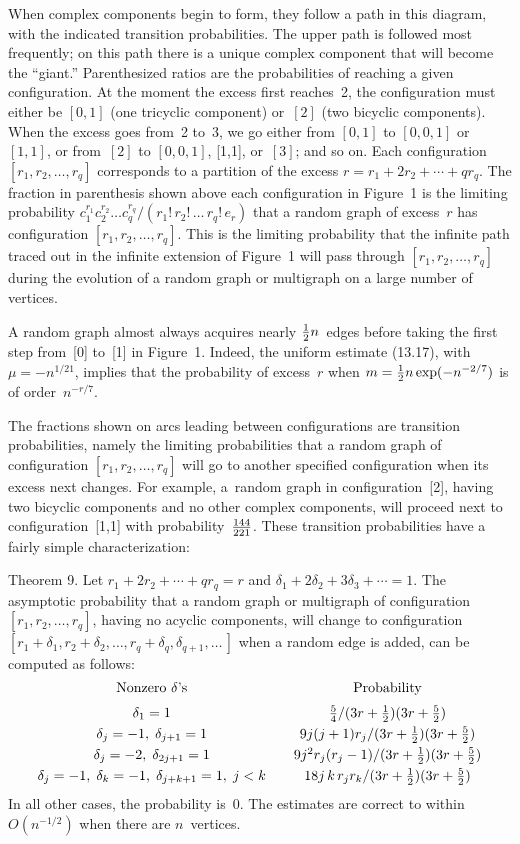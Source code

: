 \bigskip
\noindent
When complex components begin to form, they follow a path in
this diagram, with the indicated transition probabilities. The upper
path is followed most frequently; on this path
there is a unique complex component that will become
the ``giant.'' Parenthesized ratios
are the probabilities of reaching a given configuration.
At the moment the excess first reaches~2, the configuration must
either be $[0,1]$ (one tricyclic component) or~$[2]$ (two bicyclic
components). When the excess goes from~2 to~3, we go either from
$[0,1]$ to $[0,0,1]$ or $[1,1]$, or from~$[2]$ to $[0,0,1]$, [1,1],
or~$[3]$; and so on. Each configuration $[r_1,r_2,\ldots,r_q]$
corresponds to a partition of the excess $r=r_1+2r_2+\cdots +qr_q$.
The fraction in parenthesis shown above each configuration in Figure~1
is the limiting probability $c_1^{r_1}c_2^{r_2}\ldots
c_q^{r_q}\!/(r_1!\,r_2!\,\ldots\, r_q!\,e_r)$ that a random graph of
excess~$r$ has configuration $[r_1,r_2,\ldots,r_q]$. This is the
limiting probability that the infinite path traced out in the
infinite extension of Figure~1 will pass through
$[r_1,r_2,\ldots,r_q]$ during the evolution of a random graph or
multigraph on a large number of vertices.

A random graph almost always acquires nearly ${1\over2} n$~edges
before taking the first step from~[0] to~[1] in Figure~1. Indeed, the
uniform estimate (13.17), with $\mu=-n^{1/21}$, implies that the
probability of excess~$r$ when $m={1\over2} n\exp(-n^{-2/7})$ is of
order~$n^{-r/7}$.

The fractions shown on arcs leading between configurations are
transition probabilities, namely the limiting probabilities that a
random graph of configuration $[r_1,r_2,\ldots,r_q]$ will go to another
specified configuration when its excess next changes. For example, a~random
graph in configuration~[2],
having two bicyclic components and no other complex components,
will proceed next to configuration~[1,1] with
probability~${144\over 221}$. These transition probabilities have a
fairly simple characterization:

\proclaim
Theorem 9. Let $r_1+2r_2+\cdots +qr_q=r$ and
$\delta_1+2\delta_2+3\delta_3+\cdots =1$. The asymptotic probability
that a random graph or multigraph of configuration
$[r_1,r_2,\ldots,r_q]$, having no acyclic components,  will change to
configuration
$[r_1+\delta_1,r_2+\delta_2,\ldots,r_q+\delta_q,\delta_{q+1},\ldots\,]$
when a random edge is added, can be computed as follows:
$$\vcenter{\halign{$\hfil#\hfil$\qquad&$\hfil#\hfil$\cr
\hbox{\rm Nonzero $\delta$'s}&{\rm Probability}\cr
\noalign{\medskip}
\delta_1=1&{5\over 4}/(3r+\half )(3r+{5\over 2})\cr
\noalign{\smallskip}
\delta_j=-1,\;\delta_{j+1}=1&9j(j+1)r_j/(3r+\half )(3r+{5\over 2})\cr
\noalign{\smallskip}
\delta_j=-2,\;\delta_{2j+1}=1&9j^2r_j(r_j-1)/(3r+\half )(3r+{5\over 2})\cr
\noalign{\smallskip}
\delta_j=-1,\;\delta_k=-1,\;\delta_{j+k+1}=1,\;j<k%
&18j\,k\,r_jr_k/(3r+\half )(3r+{5\over 2})\cr}}$$
In all other cases, the probability is~0. The estimates are correct to
within $O(n^{-1/2})$ when there are $n$~vertices.

